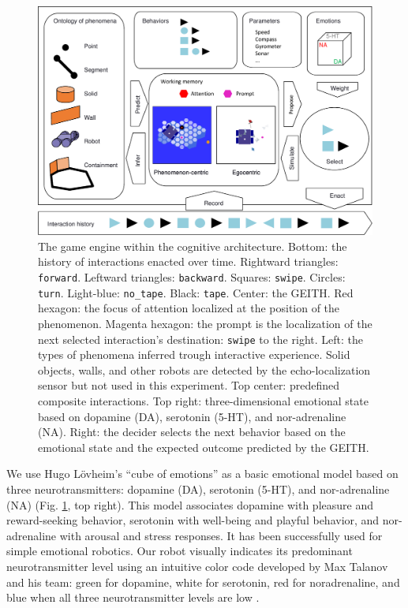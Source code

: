 \documentclass[runningheads]{llncs}
\begin{document}
\begin{figure}
	\includegraphics[width=\textwidth]{Figure_geith.pdf}
	\caption{The game engine within the cognitive architecture.
		Bottom: the history of interactions enacted over time.
		Rightward triangles: \texttt{forward}. Leftward triangles: \texttt{backward}. Squares: \texttt{swipe}. Circles: \texttt{turn}. Light-blue: \texttt{no\_tape}. Black: \texttt{tape}.
		Center: the GEITH.
		Red hexagon: the focus of attention localized at the position of the phenomenon. 
		Magenta hexagon: the prompt is the localization of the next selected interaction's destination: \texttt{swipe} to the right.
		Left: the types of phenomena inferred trough interactive experience.
		Solid objects, walls, and other robots are detected by the echo-localization sensor but not used in this experiment.
		Top center: predefined composite interactions.
		Top right: three-dimensional emotional state based on dopamine (DA), serotonin (5-HT), and nor-adrenaline (NA).
		Right: the decider selects the next behavior based on the emotional state and the expected outcome predicted by the GEITH.} \label{fig:geith}
\end{figure}

We use Hugo Lövheim's ``cube of emotions'' \cite{lovheim_new_2012} as a basic emotional model based on three neurotransmitters: dopamine (DA), serotonin (5-HT), and nor-adrenaline (NA) (Fig. \ref{fig:geith}, top right).
This model associates dopamine with pleasure and reward-seeking behavior, serotonin with well-being and playful behavior, and nor-adrenaline with arousal and stress responses.
It has been successfully used for simple emotional robotics.
Our robot visually indicates its predominant neurotransmitter level using an intuitive color code developed by Max Talanov and his team: green for dopamine, white for serotonin, red for noradrenaline, and blue when all three neurotransmitter levels are low \cite{chebotareva_emotional_2019}.
\end{document}
